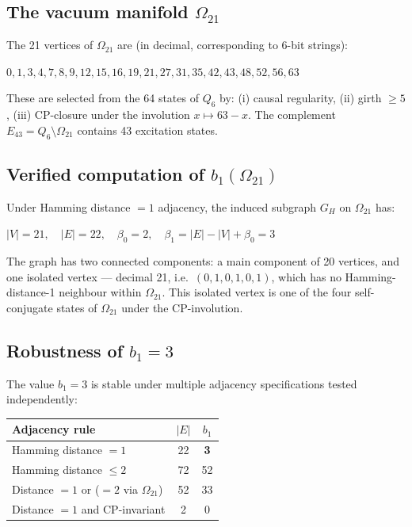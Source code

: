 \documentclass[11pt,a4paper]{article}
\begin{document}
\subsection{The vacuum manifold \texorpdfstring{$\Omega_{21}$}{Omega21}}

The 21 vertices of $\Omega_{21}$ are (in decimal, corresponding to 6-bit strings):
\begin{center}
$0, 1, 3, 4, 7, 8, 9, 12, 15, 16, 19, 21, 27, 31, 35, 42, 43, 48, 52, 56, 63$
\end{center}
These are selected from the 64 states of $Q_6$ by: (i) causal regularity, (ii) girth $\geq 5$, (iii) CP-closure under the involution $x \mapsto 63 - x$. The complement $E_{43} = Q_6 \setminus \Omega_{21}$ contains 43 excitation states.

\subsection{Verified computation of \texorpdfstring{$b_1(\Omega_{21})$}{b1(Omega21)}}

\begin{result_box}[title={Independent verification (NetworkX)}]
Under Hamming distance $= 1$ adjacency, the induced subgraph $G_H$ on $\Omega_{21}$ has:
\begin{center}
$|V| = 21, \quad |E| = 22, \quad \beta_0 = 2, \quad \beta_1 = |E| - |V| + \beta_0 = 3$
\end{center}
The graph has two connected components: a main component of 20 vertices, and one isolated vertex --- decimal 21, i.e.\ $(0,1,0,1,0,1)$, which has no Hamming-distance-1 neighbour within $\Omega_{21}$. This isolated vertex is one of the four self-conjugate states of $\Omega_{21}$ under the CP-involution.
\end{result_box}

\subsection{\texorpdfstring{Robustness of $b_1 = 3$}{Robustness of b1 = 3}}

The value $b_1 = 3$ is stable under multiple adjacency specifications tested independently:

\begin{center}
\begin{tabular}{lcc}
\toprule
Adjacency rule & $|E|$ & $b_1$ \\
\midrule
Hamming distance $= 1$ & 22 & \textbf{3} \\
Hamming distance $\leq 2$ & 72 & 52 \\
Distance $= 1$ or ($= 2$ via $\Omega_{21}$) & 52 & 33 \\
Distance $= 1$ and CP-invariant & 2 & 0 \\
\bottomrule
\end{tabular}
\end{center}
\end{document}
